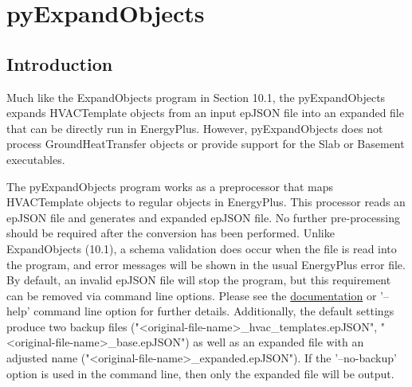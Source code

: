 \section{pyExpandObjects}

\subsection{Introduction}\label{pyExpandObjects}

Much like the ExpandObjects program in Section 10.1, the pyExpandObjects expands HVACTemplate objects from an input epJSON file into an expanded file that can be directly run in EnergyPlus.  However, pyExpandObjects does not process GroundHeatTransfer objects or provide support for the Slab or Basement executables.

The pyExpandObjects program works as a preprocessor that maps HVACTemplate objects to regular objects in EnergyPlus.  This processor reads an epJSON file and generates and expanded epJSON file.  No further pre-processing should be required after the conversion has been performed.  Unlike ExpandObjects (10.1), a schema validation does occur when the file is read into the program, and error messages will be shown in the usual EnergyPlus error file.  By default, an invalid epJSON file will stop the program, but this requirement can be removed via command line options.  Please see the \href{https://epjson-expandobjects.readthedocs.io/en/latest/?badge=latest}{documentation} or '--help' command line option for further details.  Additionally, the default settings produce two backup files ("<original-file-name>\_hvac\_templates.epJSON", "<original-file-name>\_base.epJSON") as well as an expanded file with an adjusted name ("<original-file-name>\_expanded.epJSON"). If the '--no-backup' option is used in the command line, then only the expanded file will be output.